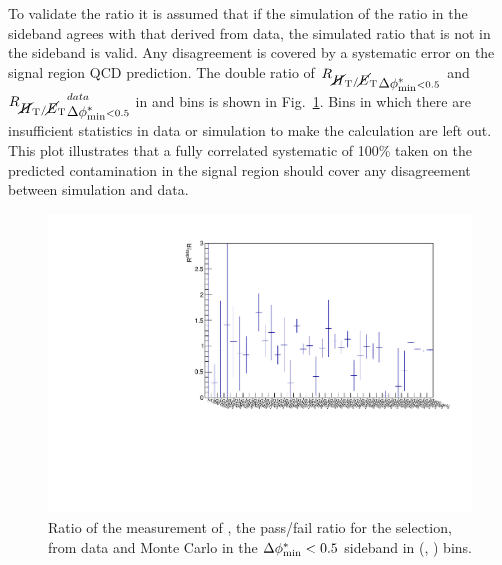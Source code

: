 To validate the ratio \rmhtmet it is assumed that if the simulation of
the ratio in the \bdphi sideband agrees with that derived from data,
the simulated ratio that is not in the sideband is valid. Any
disagreement is covered by a systematic error on the signal region QCD
prediction. The double ratio of $\mbox{$R_{\mbox{$\cancel{H}_\text{T}$} / \mbox{$\cancel{E}_\text{T}$}}$}_{\mbox{$\Delta\phi^{*}_{\rm min}$}<0.5}$ and
$\mbox{$R_{\mbox{$\cancel{H}_\text{T}$} / \mbox{$\cancel{E}_\text{T}$}}$}_{\mbox{$\Delta\phi^{*}_{\rm min}$}<0.5}^{data}$ in \scalht and \njet bins is shown in
Fig.~\ref{fig:RR_qcd}. Bins in which there are insufficient statistics
in data or simulation to make the calculation are left out. This plot
illustrates that a fully correlated systematic of 100\% taken on the
predicted \QCD contamination in the signal region should cover any
disagreement between simulation and data.

\begin{figure}[h!]
  \begin{center}        
    \includegraphics[width=\textwidth]{figs/analysis/qcdMethod/doubleQcdSbSrRatio1D}
    \caption{ Ratio of the measurement of \rmhtmet, the pass/fail
    ratio for the \mhtmet selection, from data and Monte Carlo in the
    $\mbox{$\Delta\phi^{*}_{\rm min}$} < 0.5$ sideband in (\scalht, \njet) bins.  }
    \label{fig:RR_qcd}
  \end{center} 
\end{figure}



